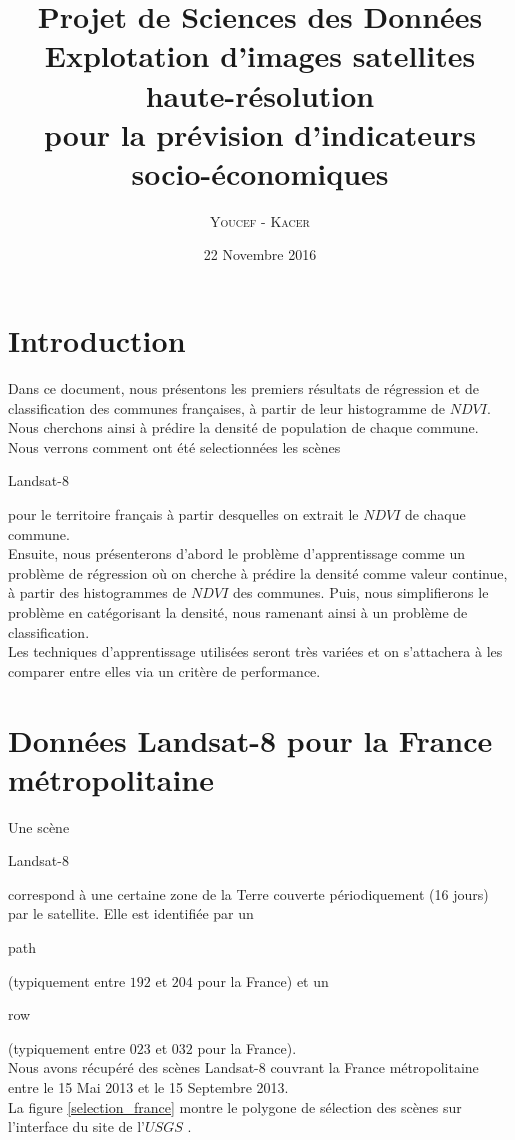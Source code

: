 \documentclass{book}
\title{%
  Projet de Sciences des Données \\
  \large Explotation d'images satellites haute-résolution \\pour la prévision d'indicateurs socio-économiques \\
    }
\author{\textsc{Youcef} - \textsc{Kacer}}
\date{22 Novembre 2016}
\begin{document}
 
\maketitle

\tableofcontents

\frontmatter
\chapter{Introduction}
Dans ce document, nous présentons les premiers résultats de régression et de classification des communes françaises, à partir de leur histogramme de $NDVI$. 
Nous cherchons ainsi à prédire la densité de population de chaque commune.\\
Nous verrons comment ont été selectionnées les scènes \begin{itshape}Landsat-8\end{itshape} pour le territoire français à partir desquelles on extrait le $NDVI$ de chaque commune.\\
Ensuite, nous présenterons d'abord le problème d'apprentissage comme un problème de régression où on cherche à prédire la densité comme valeur continue, à partir
des histogrammes de $NDVI$ des communes. Puis, nous simplifierons le problème en catégorisant la densité, nous ramenant ainsi à un problème de classification.\\
Les techniques d'apprentissage utilisées seront très variées et on s'attachera à les comparer entre elles via un critère de performance.

\mainmatter
\chapter{Données Landsat-8 pour la France métropolitaine}

Une scène \begin{itshape}Landsat-8\end{itshape} correspond à une certaine zone de la Terre couverte périodiquement (16 jours) par le satellite. 
Elle est identifiée par un \begin{itshape}path\end{itshape} (typiquement entre
$192$ et $204$ pour la France) et un \begin{itshape}row\end{itshape} (typiquement entre $023$ et $032$ pour la France).\\ 
Nous avons récupéré des scènes Landsat-8 couvrant la France métropolitaine entre le 15 Mai 2013 et le 15 Septembre 2013.\\
La figure \ref{selection_france} montre le polygone de sélection des scènes sur l'interface du site de l'$USGS$ \cite{landsat8}.
\end{document}
